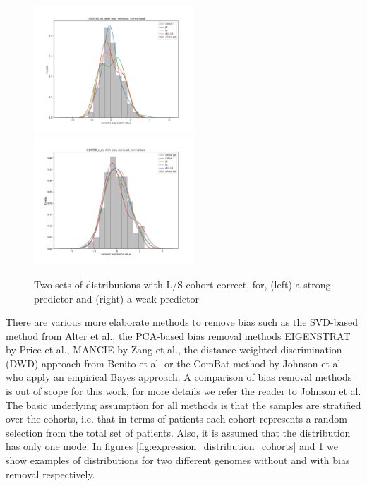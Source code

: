 \documentclass[a4paper,10pt]{article}
\begin{document}
%
\begin{figure}[htp]
\centering
\includegraphics[width=6cm]{images/strong_genome_distribution_withCorrection_standardNormalisation}
\includegraphics[width=6cm]{images/weak_genome_distribution_withCorrection_standardNormalisation}
\caption{Two sets of distributions with L/S cohort correct, for, (left) a strong predictor and (right) a weak predictor}
\label{fig:expression_distribution_cohorts_withBiasCorrection}
\end{figure}
%
There are various more elaborate methods to remove bias such as the SVD-based method from Alter et al.\cite{Alter2000}, the 
PCA-based bias removal methods EIGENSTRAT by Price et al.\cite{Price2006}, MANCIE by Zang et al.\cite{Zang2016}, the distance weighted discrimination (DWD)
approach from Benito et al.\cite{Benito2005} or the ComBat method by Johnson et al.\cite{Johnson2007} who apply an empirical Bayes approach. 
A comparison of bias removal methods is out of scope for this work, for more details we refer the reader to Johnson et al\cite{Johnson2007}.
The basic underlying assumption for all methods is that the samples are stratified over the cohorts, i.e. that in terms
of patients each cohort represents a random selection from the total set of patients. Also, it is assumed that 
the distribution has only one mode. In figures \ref{fig:expression_distribution_cohorts} and \ref{fig:expression_distribution_cohorts_withBiasCorrection}
we show examples of distributions for two different genomes without and with bias removal respectively.
\end{document}
